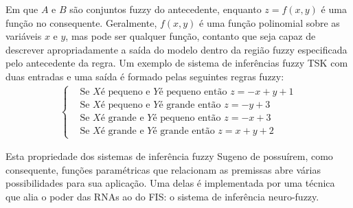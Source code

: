 Em que $A$ e $B$ são conjuntos fuzzy do antecedente, enquanto $z = f(x,y)$ é uma função no consequente. Geralmente, $f(x,y)$ é uma função polinomial sobre as variáveis $x$ e $y$, mas pode ser qualquer função, contanto que seja capaz de descrever apropriadamente a saída do modelo dentro da região fuzzy especificada pelo antecedente da regra. Um exemplo de sistema de inferências fuzzy TSK com duas entradas e uma saída é formado pelas seguintes regras fuzzy:
\begin{align*}
\begin{cases}
&\mbox{Se }X  \mbox{é pequeno e } Y \mbox{é pequeno então } z=-x+y+1 \\
&\mbox{Se }X  \mbox{é pequeno e } Y \mbox{é grande então } z=-y+3  \\
&\mbox{Se }X  \mbox{é grande e } Y \mbox{é pequeno então } z=-x+3  \\
&\mbox{Se }X  \mbox{é grande e } Y \mbox{é grande então } z=x+y+2  
\end{cases}
\end{align*}

Esta propriedade dos sistemas de inferência fuzzy Sugeno de possuírem, como consequente, funções paramétricas que relacionam as premissas abre várias possibilidades para sua aplicação. Uma delas é implementada por uma técnica que alia o poder das RNAs ao do FIS: o sistema de inferência neuro-fuzzy.



